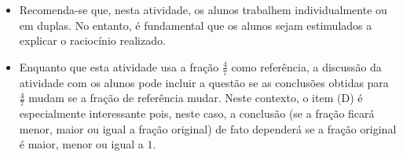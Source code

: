 \begin{orientacoes}{}{}

\begin{itemize} %
    \item       Recomenda-se que, nesta atividade, os alunos trabalhem
individualmente ou em duplas. No entanto, é fundamental que os alunos sejam
estimulados a explicar o raciocínio realizado.
    \item       Enquanto que esta atividade usa a fração       $\frac{4}{7}$
  como referência, a discussão da atividade com os alunos pode incluir a questão
se as conclusões obtidas para       $\frac{4}{7}$       mudam se a fração de
referência mudar. Neste contexto, o item (D) é especialmente interessante pois,
neste caso, a conclusão (se a fração ficará menor, maior ou igual a fração
original) de fato dependerá se a fração original é maior, menor ou igual a
$1$.
\end{itemize} %




\end{orientacoes}

